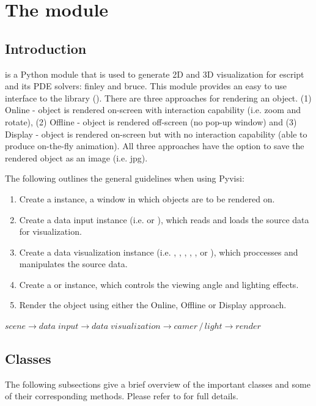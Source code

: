 \chapter{The module \pyvisi}
\label{PYVISI CHAP}

\section{Introduction}
\pyvisi is a Python module that is used to generate 2D and 3D visualization 
for escript and its PDE solvers: finley and bruce. This module provides 
an easy to use interface to the \VTK library (\VTKUrl). There are three 
approaches for rendering an object. (1) Online - object is rendered on-screen 
with interaction capability (i.e. zoom and rotate), (2) Offline - object is 
rendered off-screen (no pop-up window) and (3) Display - object is rendered 
on-screen but with no interaction capability (able to produce on-the-fly 
animation). All three approaches have the option to save the rendered object 
as an image (i.e. jpg).

The following outlines the general guidelines when using Pyvisi:

\begin{enumerate}
\item Create a \Scene instance, a window in which objects are to be rendered on.
\item Create a data input instance (i.e. \DataCollector or \ImageReader), which 
reads and loads the source data for visualization.
\item Create a data visualization instance (i.e. \Map, \Velocity, \Ellipsoid, 
\Contour, \Carpet, \StreamLine or \Image), which proccesses and manipulates the 
source data.
\item Create a \Camera or \Light instance, which controls the viewing angle and
lighting effects.
\item Render the object using either the Online, Offline or Display approach.
\end{enumerate}
\begin{center}
\begin{math}
scene \rightarrow data \; input \rightarrow data \; visualization \rightarrow 
camer \, / \, light \rightarrow render
\end{math}
\end{center}

\section{\pyvisi Classes}
The following subsections give a brief overview of the important classes 
and some of their corresponding methods. Please refer to \ReferenceGuide for 
full details.



